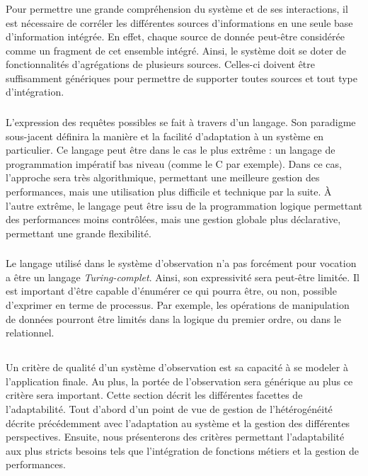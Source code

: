 \subsubsection{\critereBB}
Pour permettre une grande compréhension du système et de ses interactions, il est nécessaire de corréler les différentes sources d'informations en une seule base d'information intégrée. En effet, chaque source de donnée peut-être considérée comme un fragment de cet ensemble intégré. Ainsi, le système doit se doter de fonctionnalités d'agrégations de plusieurs sources. Celles-ci doivent être suffisamment génériques pour permettre de supporter toutes sources et tout type d'intégration.

\subsubsection{\critereBC}
L'expression des requêtes possibles se fait à travers d'un langage. Son paradigme sous-jacent définira la manière et la facilité d'adaptation à un système en particulier. Ce langage peut être dans le cas le plus extrême : un langage de programmation impératif bas niveau (comme le C par exemple). Dans ce cas, l'approche sera très algorithmique, permettant une meilleure gestion des performances, mais une utilisation plus difficile et technique par la suite. À l'autre extrême, le langage peut être issu de la programmation logique permettant des performances moins contrôlées, mais une gestion globale plus déclarative, permettant une grande flexibilité.

\subsubsection{\critereBD}
Le langage utilisé dans le système d'observation n'a pas forcément pour vocation a être un langage \textit{Turing-complet}. Ainsi, son expressivité sera peut-être limitée. Il est important d'être capable d'énumérer ce qui pourra être, ou non, possible d'exprimer en terme de processus. Par exemple, les opérations de manipulation de données pourront être limités dans la logique du premier ordre, ou dans le relationnel.

\subsection{\critereC}
Un critère de qualité d'un système d'observation est sa capacité à se modeler à l'application finale. Au plus, la portée de l'observation sera générique au plus ce critère sera important. Cette section décrit les différentes facettes de l'adaptabilité. Tout d'abord d'un point de vue de gestion de l'hétérogénéité décrite précédemment avec l'adaptation au système et la gestion des différentes perspectives. Ensuite, nous présenterons des critères permettant l'adaptabilité aux plus stricts besoins tels que l'intégration de fonctions métiers et la gestion de performances.

